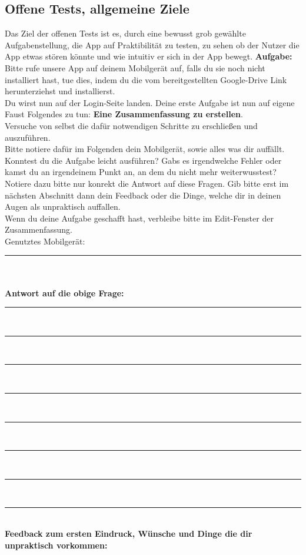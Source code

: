 \subsection{Offene Tests, allgemeine Ziele}
Das Ziel der offenen Tests ist es, durch eine bewusst grob gewählte Aufgabenstellung, die App auf Praktibilität zu testen, zu sehen ob der Nutzer die App etwas stören könnte und wie intuitiv er sich in der App bewegt.\newline
\textbf{Aufgabe:}\newline
Bitte rufe unsere App auf deinem Mobilgerät auf, falls du sie noch nicht installiert hast, tue dies, indem du die  vom bereitgestellten Google-Drive Link herunterziehst und installierst.\\
Du wirst nun auf der Login-Seite landen. Deine erste Aufgabe ist nun auf eigene Faust Folgendes zu tun: \textbf{Eine Zusammenfassung zu erstellen}.\\Versuche von selbst die dafür notwendigen Schritte zu erschließen und auszuführen.\\
Bitte notiere dafür im Folgenden dein Mobilgerät, sowie alles was dir auffällt. Konntest du die Aufgabe leicht ausführen? Gabs es irgendwelche Fehler oder kamst du an irgendeinem Punkt an, an dem du nicht mehr weiterwusstest?\\
Notiere dazu bitte nur konrekt die Antwort auf diese Fragen. Gib bitte erst im nächsten Abschnitt dann dein Feedback oder die Dinge, welche dir in deinen Augen als unpraktisch auffallen.\\
Wenn du deine Aufgabe geschafft hast, verbleibe bitte im Edit-Fenster der Zusammenfassung.\\
Genutztes Mobilgerät: \rule{0.25\textwidth}{0.4pt}\\\\
\textbf{Antwort auf die obige Frage:}\\
\noindent\rule{\textwidth}{0.4pt}\\
\noindent\rule{\textwidth}{0.4pt}\\
\noindent\rule{\textwidth}{0.4pt}\\
\noindent\rule{\textwidth}{0.4pt}\\
\noindent\rule{\textwidth}{0.4pt}\\
\noindent\rule{\textwidth}{0.4pt}\\
\noindent\rule{\textwidth}{0.4pt}\\
\noindent\rule{\textwidth}{0.4pt}\\
\textbf{Feedback zum ersten Eindruck, Wünsche und Dinge die dir unpraktisch vorkommen:}
